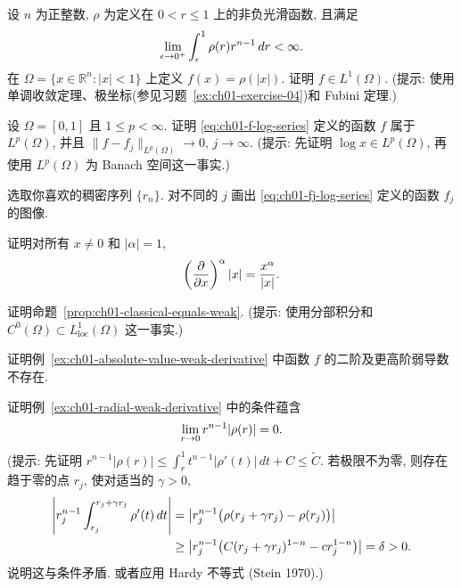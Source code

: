 \begin{MBExercise}
\label{ex:ch01-exercise-05}
设 $n$ 为正整数, $\rho$ 为定义在 $0<r\leq1$ 上的非负光滑函数, 且满足
\[
\MathBookFormulaID{formula-ch01-exercise-05-radial-integrability}
\lim_{\epsilon\to0^+}\int_\epsilon^1\rho(r)r^{n-1}\,dr<\infty.
\]
在 $\Omega=\{x\in\mathbb R^n:|x|<1\}$ 上定义 $f(x)=\rho(|x|)$. 证明 $f\in L^1(\Omega)$. (提示: 使用单调收敛定理、极坐标(参见习题~\ref{ex:ch01-exercise-04})和 Fubini 定理.)
\end{MBExercise}

\begin{MBExercise}
\label{ex:ch01-exercise-06}
设 $\Omega=[0,1]$ 且 $1\leq p<\infty$. 证明 \eqref{eq:ch01-f-log-series} 定义的函数 $f$ 属于 $L^p(\Omega)$, 并且 $\|f-f_j\|_{L^p(\Omega)}\to0$, $j\to\infty$. (提示: 先证明 $\log x\in L^p(\Omega)$, 再使用 $L^p(\Omega)$ 为 Banach 空间这一事实.)
\end{MBExercise}

\begin{MBExercise}
\label{ex:ch01-exercise-07}
选取你喜欢的稠密序列 $\{r_n\}$. 对不同的 $j$ 画出 \eqref{eq:ch01-fj-log-series} 定义的函数 $f_j$ 的图像.
\end{MBExercise}

\begin{MBExercise}
\label{ex:ch01-exercise-08}
证明对所有 $x\neq0$ 和 $|\alpha|=1$,
\[
\MathBookFormulaID{formula-ch01-exercise-08-radial-derivative}
\left(\frac{\partial}{\partial x}\right)^\alpha|x|=\frac{x^\alpha}{|x|}.
\]
\end{MBExercise}

\begin{MBExercise}
\label{ex:ch01-exercise-09}
证明命题~\ref{prop:ch01-classical-equals-weak}. (提示: 使用分部积分和 $C^0(\Omega)\subset L_{\mathrm{loc}}^1(\Omega)$ 这一事实.)
\end{MBExercise}

\begin{MBExercise}
\label{ex:ch01-exercise-10}
证明例~\ref{ex:ch01-absolute-value-weak-derivative} 中函数 $f$ 的二阶及更高阶弱导数不存在.
\end{MBExercise}

\begin{MBExercise}
\label{ex:ch01-exercise-11}
证明例~\ref{ex:ch01-radial-weak-derivative} 中的条件蕴含
\[
\MathBookFormulaID{formula-ch01-exercise-11-rho-limit}
\lim_{r\to0}r^{n-1}|\rho(r)|=0.
\]
(提示: 先证明 $r^{n-1}|\rho(r)|\leq\int_r^1t^{n-1}|\rho'(t)|\,dt+C\leq\widetilde C$. 若极限不为零, 则存在趋于零的点 $r_j$, 使对适当的 $\gamma>0$,
\[
\MathBookFormulaID{formula-ch01-exercise-11-contradiction-bound}
\begin{aligned}
\left|r_j^{n-1}\int_{r_j}^{r_j+\gamma r_j}\rho'(t)\,dt\right|
&=\left|r_j^{n-1}\bigl(\rho(r_j+\gamma r_j)-\rho(r_j)\bigr)\right|\\
&\geq\left|r_j^{n-1}
\bigl(C(r_j+\gamma r_j)^{1-n}-cr_j^{1-n}\bigr)\right|=\delta>0.
\end{aligned}
\]
说明这与条件矛盾. 或者应用 Hardy 不等式 (Stein 1970).)
\end{MBExercise}


